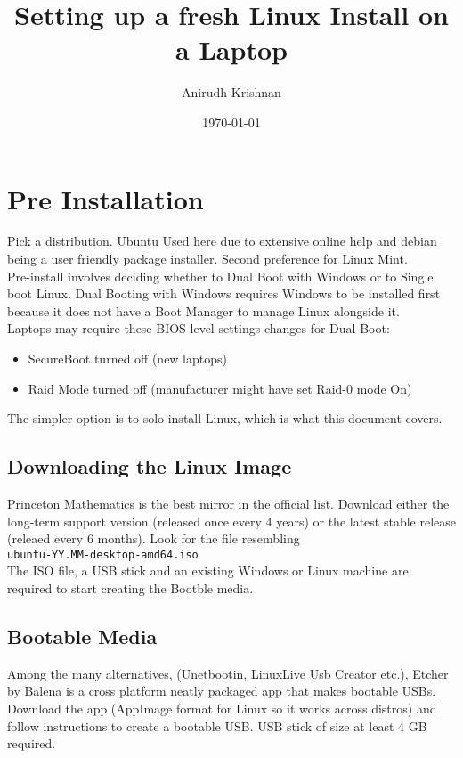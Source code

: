 \documentclass[10pt,letterpaper]{article}
\title{Setting up a fresh Linux Install on a Laptop}
\author{Anirudh Krishnan}
\date{\today}
\begin{document}
\maketitle
\newpage

\tableofcontents
\newpage

\section{Pre Installation}

Pick a distribution. Ubuntu Used here due to extensive online help and debian being a user friendly package installer. Second preference for Linux Mint. \\

Pre-install involves deciding whether to Dual Boot with Windows or to Single boot Linux. Dual Booting with Windows requires Windows to be installed first because it does not have a Boot Manager to manage Linux alongside it. \\

Laptops may require these BIOS level settings changes for Dual Boot:

\begin{itemize}
	\item SecureBoot turned off (new laptops)
	\item Raid Mode turned off (manufacturer might have set Raid-0 mode On)
\end{itemize}

The simpler option is to solo-install Linux, which is what this document covers.

\subsection{Downloading the Linux Image}

Princeton Mathematics is the best mirror in the official list. Download either the long-term support version (released once every 4 years) or the latest stable release (releaed every 6 months). Look for the file resembling \\ 

\texttt{ubuntu-YY.MM-desktop-amd64.iso} \\

The ISO file, a USB stick and an existing Windows or Linux machine are required to start creating the Bootble media.



\subsection{Bootable Media}
Among the many alternatives, (Unetbootin, LinuxLive Usb Creator etc.), Etcher by Balena is a cross platform neatly packaged app that makes bootable USBs. Download the app (AppImage format for Linux so it works across distros) and follow instructions to create a bootable USB. USB stick of size at least 4 GB required.\\
\end{document}
